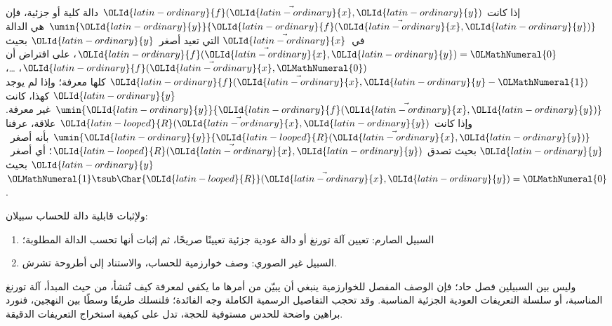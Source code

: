 \documentclass[../../../include/open-logic-section]{subfiles}
\begin{document}
إذا كانت $\OLId{latin-ordinary}{f}(\vec \OLId{latin-ordinary}{x},\OLId{latin-ordinary}{y})$ دالة كلية أو جزئية، فإن
$\umin{\OLId{latin-ordinary}{y}}{\OLId{latin-ordinary}{f}(\vec \OLId{latin-ordinary}{x},\OLId{latin-ordinary}{y})}$ هي الدالة في~$\vec \OLId{latin-ordinary}{x}$ التي تعيد أصغر~$\OLId{latin-ordinary}{y}$
بحيث $\OLId{latin-ordinary}{f}(\vec \OLId{latin-ordinary}{x},\OLId{latin-ordinary}{y})=\OLMathNumeral{0}$، على افتراض أن $\OLId{latin-ordinary}{f}(\vec \OLId{latin-ordinary}{x},\OLMathNumeral{0})$، …،
$\OLId{latin-ordinary}{f}(\vec \OLId{latin-ordinary}{x},\OLId{latin-ordinary}{y}-\OLMathNumeral{1})$ كلها معرفة؛ وإذا لم يوجد $\OLId{latin-ordinary}{y}$ كهذا، كانت
$\umin{\OLId{latin-ordinary}{y}}{\OLId{latin-ordinary}{f}(\vec \OLId{latin-ordinary}{x},\OLId{latin-ordinary}{y})}$ غير معرفة. وإذا كانت $\OLId{latin-looped}{R}(\vec \OLId{latin-ordinary}{x},\OLId{latin-ordinary}{y})$ علاقة،
عرفنا $\umin{\OLId{latin-ordinary}{y}}{\OLId{latin-looped}{R}(\vec \OLId{latin-ordinary}{x},\OLId{latin-ordinary}{y})}$ بأنه أصغر~$\OLId{latin-ordinary}{y}$ بحيث تصدق
$\OLId{latin-looped}{R}(\vec \OLId{latin-ordinary}{x},\OLId{latin-ordinary}{y})$؛ أي أصغر~$\OLId{latin-ordinary}{y}$ بحيث $\OLMathNumeral{1}\tsub\Char{\OLId{latin-looped}{R}}(\vec \OLId{latin-ordinary}{x},\OLId{latin-ordinary}{y})=\OLMathNumeral{0}$.

ولإثبات قابلية دالة للحساب سبيلان:
\begin{enumerate}
\item السبيل الصارم: تعيين آلة تورنغ أو دالة عودية جزئية تعيينًا صريحًا،
  ثم إثبات أنها تحسب الدالة المطلوبة؛
\item السبيل غير الصوري: وصف خوارزمية للحساب، والاستناد إلى أطروحة تشرش.
\end{enumerate}
وليس بين السبيلين فصل حاد؛ فإن الوصف المفصل للخوارزمية ينبغي أن يبيّن
من أمرها ما يكفي لمعرفة كيف تُنشأ، من حيث المبدأ، آلة
تورنغ المناسبة، أو سلسلة التعريفات العودية الجزئية المناسبة. وقد تحجب
التفاصيل الرسمية الكاملة وجه الفائدة؛ فلنسلك طريقًا وسطًا بين
النهجين، فنورد براهين واضحة للحدس مستوفية للحجة، تدل على كيفية استخراج
التعريفات الدقيقة.
\end{document}
